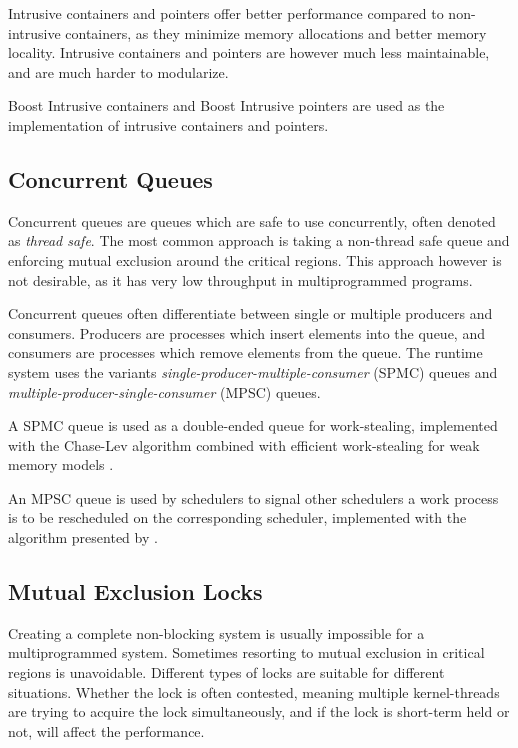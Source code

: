 Intrusive containers and pointers offer better performance compared to non\hyp{}intrusive containers, as they minimize memory allocations and better memory locality. Intrusive containers and pointers are however much less maintainable, and are much harder to modularize.

Boost Intrusive containers and Boost Intrusive pointers are used as the implementation of intrusive containers and pointers.


\subsection{Concurrent Queues}


Concurrent queues are queues which are safe to use concurrently, often denoted as \textit{thread safe}. The most common approach is taking a non\hyp{}thread safe queue and enforcing mutual exclusion around the critical regions. This approach however is not desirable, as it has very low throughput in multiprogrammed programs.

Concurrent queues often differentiate between single or multiple producers and consumers. Producers are processes which insert elements into the queue, and consumers are processes which remove elements from the queue. The runtime system uses the variants \textit{single\hyp{}producer\hyp{}multiple\hyp{}consumer} (SPMC) queues and \textit{multiple\hyp{}producer\hyp{}single\hyp{}consumer} (MPSC) queues.

A SPMC queue is used as a double\hyp{}ended queue for work\hyp{}stealing, implemented with the Chase\hyp{}Lev algorithm \citep{chase2005dynamic} combined with efficient work\hyp{}stealing for weak memory models \citep{le2013correct}.

An MPSC queue is used by schedulers to signal other schedulers a work process is to be rescheduled on the corresponding scheduler, implemented with the algorithm presented by \citet{vyukov2014intrusive}. 


\subsection{Mutual Exclusion Locks}


Creating a complete non\hyp{}blocking system is usually impossible for a multiprogrammed system. Sometimes resorting to mutual exclusion in critical regions is unavoidable. Different types of locks are suitable for different situations. Whether the lock is often contested, meaning multiple kernel\hyp{}threads are trying to acquire the lock simultaneously, and if the lock is short\hyp{}term held or not, will affect the performance. 

